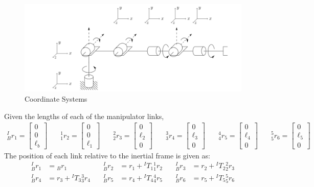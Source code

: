 \documentclass[12pt]{report}
\begin{document}
\newpage
\begin{figure}[htp]
  \centering
  \includegraphics[width=.9\textwidth]{zero}
  \caption{Coordinate Systems}
  \label{fig:coords}
\end{figure}

Given the lengths of each of the manipulator links,
\[
\begin{aligned}
  ^I_Br_1 = \begin{bmatrix} 0\\0\\ \ell_b\end{bmatrix} & \quad
  ^1_1r_2 = \begin{bmatrix} 0\\0\\ \ell_1\end{bmatrix} & \quad
  ^2_2r_3 = \begin{bmatrix} 0\\\ell_2\\ 0\end{bmatrix} & \quad
  ^3_3r_4 = \begin{bmatrix} 0\\\ell_3\\ 0\end{bmatrix} & \quad
  ^4_4r_5 = \begin{bmatrix} 0\\\ell_4\\ 0\end{bmatrix} & \quad
  ^5_5r_6 = \begin{bmatrix} 0\\\ell_5\\ 0\end{bmatrix} & \quad
\end{aligned}
\]
The position of each link relative to the inertial frame is given as:
\[
\begin{aligned}
^I_Br_1 &= {}_Br_1 &\quad
^I_Br_2 &= r_1 + {}^IT_1 {}^1_1r_2 &\quad
^I_Br_3 &= r_2 + {}^IT_2 {}^2_2r_3 \\[.5em]
^I_Br_4 &= r_3 + {}^IT_3 {}^3_3r_4 &\quad
^I_Br_5 &= r_4 + {}^IT_4 {}^4_4r_5 &\quad
^I_Br_6 &= r_5 + {}^IT_5 {}^5_5r_6
\end{aligned}
\]
\end{document}
